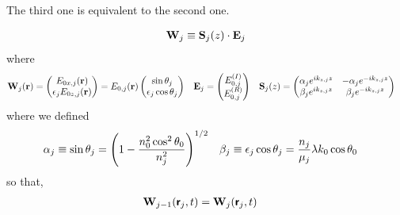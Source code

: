 The third one is equivalent to the second one.

\begin{align*}
	\vb{W}_j \equiv \vb{S}_j\pqty{z}\cdot\vb{E}_j
\end{align*} where
\begin{align*}
	\vb{W}_j\pqty{\vb{r}} &= \pmqty{E_{0x,j}\pqty{\vb{r}} \\ \epsilon_j E_{0z,j}\pqty{\vb{r}}} = E_{0,j}\pqty{\vb{r}}\pmqty{\sin\theta_j \\ \epsilon_j \cos\theta_j}
	&\vb{E}_j &= \pmqty{E_{0,j}^{(I)} \\ E_{0,j}^{(R)}} 
	& 
	\vb{S}_j\pqty{z} &= \pmqty{
		\alpha_j e^{ik_{z,j}z} & 
		-\alpha_j e^{-ik_{z,j}z} \\
		\beta_j e^{ik_{z,j}z} & 
		\beta_j e^{-ik_{z,j}z}}
\end{align*} where we defined
\begin{align*}
	\alpha_j &\equiv \sin\theta_j = \pqty{1 - \frac{n_0^2\cos^2\theta_0}{n_{j}^2}}^{1/2} & \beta_j &\equiv \epsilon_j\cos\theta_j  = \frac{n_j}{\mu_j} \lambda k_0 \cos\theta_0
\end{align*}so that,
\begin{align*}
	\vb{W}_{j-1}\pqty{\boldsymbol{\mathsf{r}}_j,t} &= \vb{W}_{j}\pqty{\boldsymbol{\mathsf{r}}_j,t}
\end{align*}

